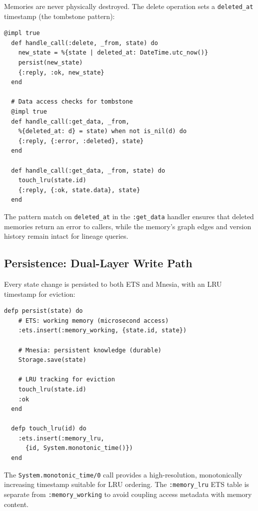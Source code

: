 \documentclass[12pt,a4paper]{article}
\theoremstyle{definition}
\begin{document}
Memories are never physically destroyed.
The delete operation sets a \texttt{deleted\_at} timestamp (the tombstone pattern):

\begin{lstlisting}[caption={Soft delete via tombstone timestamp.}, label={lst:soft-delete}]
  @impl true
  def handle_call(:delete, _from, state) do
    new_state = %{state | deleted_at: DateTime.utc_now()}
    persist(new_state)
    {:reply, :ok, new_state}
  end

  # Data access checks for tombstone
  @impl true
  def handle_call(:get_data, _from,
    %{deleted_at: d} = state) when not is_nil(d) do
    {:reply, {:error, :deleted}, state}
  end

  def handle_call(:get_data, _from, state) do
    touch_lru(state.id)
    {:reply, {:ok, state.data}, state}
  end
\end{lstlisting}

The pattern match on \texttt{deleted\_at} in the \texttt{:get\_data} handler ensures that deleted memories return an error to callers, while the memory's graph edges and version history remain intact for lineage queries.

\subsection{Persistence: Dual-Layer Write Path}\label{subsec:persist}

Every state change is persisted to both ETS and Mnesia, with an LRU timestamp for eviction:

\begin{lstlisting}[caption={Dual-layer persistence with LRU tracking.}, label={lst:persist}]
  defp persist(state) do
    # ETS: working memory (microsecond access)
    :ets.insert(:memory_working, {state.id, state})

    # Mnesia: persistent knowledge (durable)
    Storage.save(state)

    # LRU tracking for eviction
    touch_lru(state.id)
    :ok
  end

  defp touch_lru(id) do
    :ets.insert(:memory_lru,
      {id, System.monotonic_time()})
  end
\end{lstlisting}

The \texttt{System.monotonic\_time/0} call provides a high-resolution, monotonically increasing timestamp suitable for LRU ordering.
The \texttt{:memory\_lru} ETS table is separate from \texttt{:memory\_working} to avoid coupling access metadata with memory content.
\end{document}
